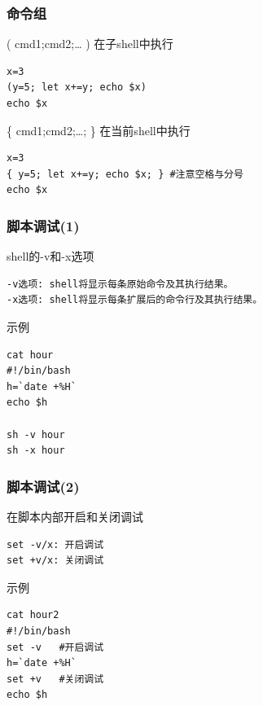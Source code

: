\documentclass[xcolor=svgnames,presentation]{beamer}
\begin{document}
\begin{frame}[fragile]
\frametitle{命令组}
\label{sec-1-3-23}
\begin{exampleblock}{( cmd1;cmd2;\ldots{} ) 在子shell中执行}
\label{sec-1-3-23-1}


\begin{verbatim}
x=3
(y=5; let x+=y; echo $x)
echo $x
\end{verbatim}
\end{exampleblock}
\begin{block}{\{ cmd1;cmd2;\ldots{}; \} 在当前shell中执行}
\label{sec-1-3-23-2}


\begin{verbatim}
x=3
{ y=5; let x+=y; echo $x; } #注意空格与分号
echo $x
\end{verbatim}
\end{block}
\end{frame}
\begin{frame}[fragile]
\frametitle{脚本调试(1)}
\label{sec-1-3-24}
\begin{exampleblock}{shell的-v和-x选项}
\label{sec-1-3-24-1}


\begin{verbatim}
-v选项: shell将显示每条原始命令及其执行结果。
-x选项: shell将显示每条扩展后的命令行及其执行结果。
\end{verbatim}
\end{exampleblock}
\begin{block}{示例}
\label{sec-1-3-24-2}


\begin{verbatim}
cat hour
#!/bin/bash
h=`date +%H`
echo $h

sh -v hour
sh -x hour
\end{verbatim}
\end{block}
\end{frame}
\begin{frame}[fragile]
\frametitle{脚本调试(2)}
\label{sec-1-3-25}
\begin{exampleblock}{在脚本内部开启和关闭调试}
\label{sec-1-3-25-1}


\begin{verbatim}
set -v/x: 开启调试
set +v/x: 关闭调试
\end{verbatim}
\end{exampleblock}
\begin{block}{示例}
\label{sec-1-3-25-2}


\begin{verbatim}
cat hour2
#!/bin/bash
set -v   #开启调试
h=`date +%H`
set +v   #关闭调试
echo $h
\end{verbatim}
\end{block}
\end{frame}
\end{document}
